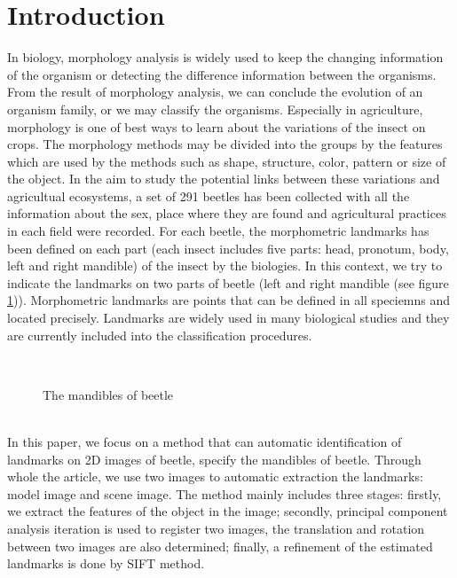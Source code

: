 \documentclass[twoside,twocolumn,10pt]{article}
\begin{document}
\section{Introduction}

\copyrightspace

In biology, morphology analysis is widely used to keep the changing
information of the organism or detecting the difference information
between the organisms. From the result of morphology analysis, we can
conclude the evolution of an organism family, or we may classify the
organisms. Especially in agriculture, morphology is one of best ways
to learn about the variations of the insect on crops. The morphology
methods may be divided into the groups by the features which are used
by the methods such as shape, structure, color, pattern or size of the
object. In the aim to study the potential links between these
variations and agricultual ecosystems, a set of 291 beetles has been
collected with all the information about the sex, place where they are
found and agricultural practices in each field were recorded. For each
beetle, the morphometric landmarks has been defined on each part (each
insect includes five parts: head, pronotum, body, left and right
mandible) of the insect by the biologies. In this context, we try to
indicate the landmarks on two parts of beetle (left and right mandible
(see figure \ref{figparts})). Morphometric landmarks are points that
can be defined in all speciemns and located precisely. Landmarks are
widely used in many biological studies and they are currently included
into the classification procedures.\\[0.1cm]

\begin{figure}[h]
\centering
{}~~
\caption{The mandibles of beetle}
\label{figparts}
\end{figure}~\\[0.1cm]
In this paper, we focus on a method that can automatic identification
of landmarks on 2D images of beetle, specify the mandibles of
beetle. Through whole the article, we use two images to automatic
extraction the landmarks: model image and scene image. The method
mainly includes three stages: firstly, we extract the features of the
object in the image; secondly, principal component analysis iteration is 
used to register two images, the translation and
rotation between two images are also determined; finally, a refinement of
the estimated landmarks is done by SIFT method.\\[0.1cm]
\end{document}
